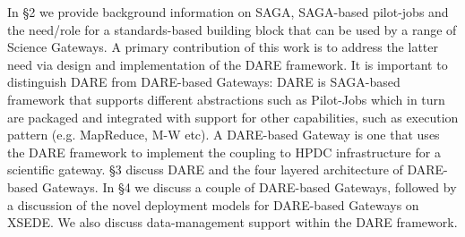 \documentclass[]{svjour3}
\begin{document}
In \S2 we provide background information on SAGA, SAGA-based
pilot-jobs and the need/role for a standards-based building block that
can be used by a range of Science Gateways.  A primary contribution of
this work is to address the latter need via design and implementation
of the DARE framework.  It is important to distinguish DARE from
DARE-based Gateways: DARE is SAGA-based framework that supports
different abstractions such as Pilot-Jobs which in turn are packaged
and integrated with support for other capabilities, such as execution
pattern (e.g. MapReduce, M-W etc). A DARE-based Gateway is one that
uses the DARE framework to implement the coupling to HPDC
infrastructure for a scientific gateway.  \S3 discuss DARE and the
four layered architecture of DARE-based Gateways. In \S4 we discuss a
couple of DARE-based Gateways, followed by a discussion of the novel
deployment models for DARE-based Gateways on XSEDE. We also discuss
data-management support within the DARE framework.


\end{document}
